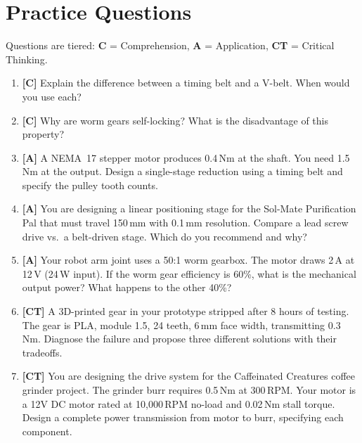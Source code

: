 \documentclass[11pt,letterpaper,twoside,openany]{book}
\begin{document}
\section{Practice Questions}
Questions are tiered: \textbf{C} = Comprehension, \textbf{A} = Application, \textbf{CT} = Critical Thinking.
\begin{enumerate}[leftmargin=1.5em]
\item \textbf{[C]} Explain the difference between a timing belt and a V-belt. When would you use each?
\item \textbf{[C]} Why are worm gears self-locking? What is the disadvantage of this property?
\item \textbf{[A]} A NEMA~17 stepper motor produces 0.4\,Nm at the shaft. You need 1.5\,Nm at the output. Design a single-stage reduction using a timing belt and specify the pulley tooth counts.
\item \textbf{[A]} You are designing a linear positioning stage for the Sol-Mate Purification Pal that must travel 150\,mm with 0.1\,mm resolution. Compare a lead screw drive vs.\ a belt-driven stage. Which do you recommend and why?
\item \textbf{[A]} Your robot arm joint uses a 50:1 worm gearbox. The motor draws 2\,A at 12\,V (24\,W input). If the worm gear efficiency is 60\%, what is the mechanical output power? What happens to the other 40\%?
\item \textbf{[CT]} A 3D-printed gear in your prototype stripped after 8 hours of testing. The gear is PLA, module 1.5, 24 teeth, 6\,mm face width, transmitting 0.3\,Nm. Diagnose the failure and propose three different solutions with their tradeoffs.
\item \textbf{[CT]} You are designing the drive system for the Caffeinated Creatures coffee grinder project. The grinder burr requires 0.5\,Nm at 300\,RPM. Your motor is a 12V DC motor rated at 10{,}000\,RPM no-load and 0.02\,Nm stall torque. Design a complete power transmission from motor to burr, specifying each component.
\end{enumerate}
\end{document}
